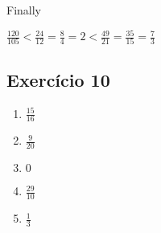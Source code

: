 Finally

$\frac{120}{105} < \frac{24}{12}=\frac{8}{4}=2 < \frac{49}{21} =
\frac{35}{15}=\frac{7}{3}$

\subsection*{Exercício 10}

\begin{enumerate}
  \item $\frac{15}{16}$
  \item $\frac{9}{20}$
  \item $0$
  \item $\frac{29}{10}$
  \item $\frac{1}{3}$
\end{enumerate}

